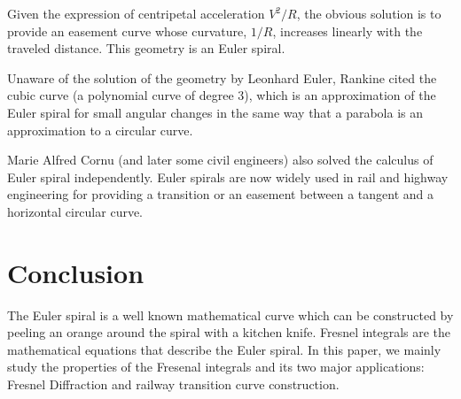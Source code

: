 \documentclass[12pt]{article}
\begin{document}
Given the expression of centripetal acceleration $V^{2} / R$, the obvious solution is to provide an easement curve whose curvature, $1/R$, increases linearly with the traveled distance. This geometry is an Euler spiral.

Unaware of the solution of the geometry by Leonhard Euler, Rankine cited the cubic curve (a polynomial curve of degree 3), which is an approximation of the Euler spiral for small angular changes in the same way that a parabola is an approximation to a circular curve.

Marie Alfred Cornu (and later some civil engineers) also solved the calculus of Euler spiral independently. Euler spirals are now widely used in rail and highway engineering for providing a transition or an easement between a tangent and a horizontal circular curve.



\section{Conclusion}
The Euler spiral is a well known mathematical curve which can be constructed by peeling an orange around the spiral with a kitchen knife. Fresnel integrals are the mathematical equations that describe the Euler spiral. In this paper, we mainly study the properties of the Fresenal integrals and its two major applications: Fresnel Diffraction and railway transition curve construction.






\end{document}
